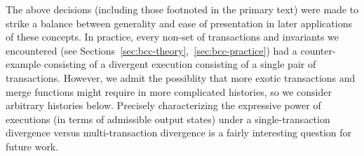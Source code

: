 The above decisions (including those footnoted in the primary text)
were made to strike a balance between generality and ease of
presentation in later applications of these concepts. In practice,
every non-\iconfluent set of transactions and invariants we
encountered (see
Sections~\ref{sec:bcc-theory},~\ref{sec:bcc-practice}) had a
counter-example consisting of a divergent execution consisting of a
single pair of transactions. However, we admit the possiblity that
more exotic transactions and merge functions might require in more
complicated histories, so we consider arbitrary histories
below. Precisely characterizing the expressive power of executions (in
terms of admissible output states) under a single-transaction
divergence versus multi-transaction divergence is a fairly interesting
question for future work.

\fi